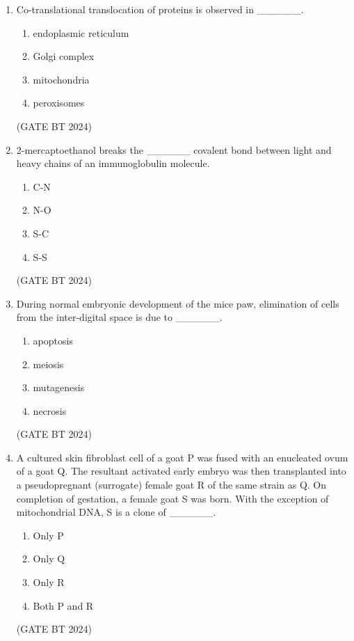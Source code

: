 \documentclass[journal,12pt,onecolumn]{IEEEtran}
\theoremstyle{remark}
\begin{document}
\begin{enumerate}
\item 
Co-translational translocation of proteins is observed in \_\_\_\_\_\_.
\begin{multicols}{2}
\begin{enumerate}
    \item endoplasmic reticulum
    \item Golgi complex
    \item mitochondria
    \item peroxisomes
\end{enumerate}
\end{multicols}
\hfill(GATE BT 2024)

\item 
2-mercaptoethanol breaks the \_\_\_\_\_\_ covalent bond between light and heavy chains of an immunoglobulin molecule.
\begin{multicols}{2}
\begin{enumerate}
    \item C-N
    \item N-O
    \item S-C
    \item S-S
\end{enumerate}
\end{multicols}
\hfill(GATE BT 2024)

\item 
During normal embryonic development of the mice paw, elimination of cells from the inter-digital space is due to \_\_\_\_\_\_.
\begin{multicols}{2}
\begin{enumerate}
    \item apoptosis
    \item meiosis
    \item mutagenesis
    \item necrosis
\end{enumerate}
\end{multicols}
\hfill(GATE BT 2024)

\item 
A cultured skin fibroblast cell of a goat P was fused with an enucleated ovum of a goat Q. The resultant activated early embryo was then transplanted into a pseudopregnant (surrogate) female goat R of the same strain as Q. On completion of gestation, a female goat S was born. With the exception of mitochondrial DNA, S is a clone of \_\_\_\_\_\_.
\begin{multicols}{2}
\begin{enumerate}
    \item Only P
    \item Only Q
    \item Only R
    \item Both P and R
\end{enumerate}
\end{multicols}
\hfill(GATE BT 2024)


\end{enumerate}
\end{document}
